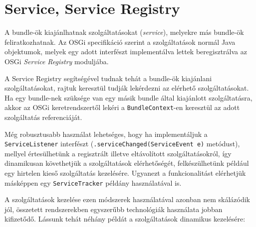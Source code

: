 
\section{Service, Service Registry}
\label{sec:service}

A bundle-ök kiajánlhatnak szolgáltatásokat (\textit{service}), melyekre más bundle-ök feliratkozhatnak. Az OSGi specifikáció szerint a szolgáltatások normál Java objektumok, melyek egy adott interfészt implementálva lettek beregisztrálva az OSGi \textit{Service Registry} moduljába.

A Service Registry segítségével tudnak tehát a bundle-ök kiajánlani szolgáltatásokat, rajtuk keresztül tudják lekérdezni az elérhető szolgáltatásokat. Ha egy bundle-nek szüksége van egy másik bundle által kiajánlott szolgáltatásra, akkor az OSGi keretrendszertől lekéri a \texttt{BundleContext}-en keresztül az adott szolgáltatás referenciáját.

Még robusztusabb használat lehetséges, hogy ha implementáljuk a \texttt{ServiceListener} interfészt (\texttt{.serviceChanged(ServiceEvent e)} metódust), mellyel értesülhetünk a regisztrált illetve eltávolított szolgáltatásokról, így dinamikusan követhetjük a szolgáltatások elérhetőségét, felkészülhetünk például egy hirtelen kieső szolgáltatás kezelésére. Ugyanezt a funkcionalitást elérhetjük másképpen egy \texttt{ServiceTracker} példány használatával is.

A szolgáltatások kezelése ezen módszerek használatával azonban nem skálázódik jól, összetett rendszerekben egyszerűbb technológiák használata jobban kifizetődő. Lássunk tehát néhány példát a szolgáltatások dinamikus kezelésére:

